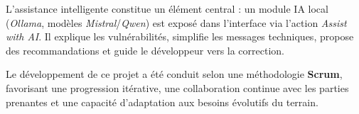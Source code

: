\medskip
\noindent L'assistance intelligente constitue un élément central : un module IA local (\textit{Ollama}, modèles \textit{Mistral}/\textit{Qwen}) est exposé dans l'interface via l'action \textit{Assist with AI}. Il explique les vulnérabilités, simplifie les messages techniques, propose des recommandations et guide le développeur vers la correction.

\medskip
\noindent Le développement de ce projet a été conduit selon une méthodologie \textbf{Scrum}, favorisant une progression itérative, une collaboration continue avec les parties prenantes et une capacité d'adaptation aux besoins évolutifs du terrain.

\clearpage